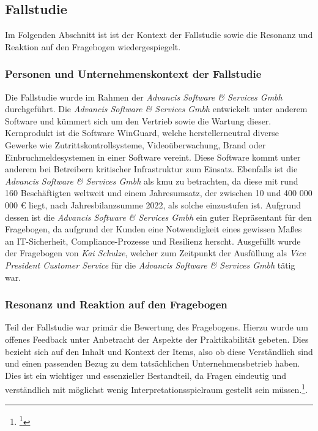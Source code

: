 \documentclass[11pt,a4paper,hidelinks]{article}   %
\begin{document}
        \subsection{Fallstudie}
        Im Folgenden Abschnitt ist ist der Kontext der Fallstudie sowie die Resonanz und Reaktion auf den Fragebogen wiedergespiegelt. 
        \subsubsection{Personen und Unternehmenskontext der Fallstudie}
        Die Fallstudie wurde im Rahmen der \emph{Advancis Software \& Services Gmbh} durchgeführt. Die \emph{Advancis Software \& Services Gmbh} entwickelt unter anderem Software und kümmert sich um den Vertrieb sowie die Wartung dieser. Kernprodukt ist die Software WinGuard, welche herstellerneutral diverse Gewerke wie Zutrittskontrollsysteme, Videoüberwachung, Brand oder Einbruchmeldesystemen in einer Software vereint. Diese Software kommt unter anderem bei Betreibern kritischer Infrastruktur zum Einsatz. Ebenfalls ist die \emph{Advancis Software \& Services Gmbh} als \gls{kmu} zu betrachten, da diese mit rund 160 Beschäftigten weltweit und einem Jahresumsatz, der zwischen 10 und 400 000 000 € liegt, nach Jahresbilanzsumme 2022, als solche einzustufen ist. Aufgrund dessen ist die \emph{Advancis Software \& Services Gmbh} ein guter Repräsentant für den Fragebogen, da aufgrund der Kunden eine Notwendigkeit eines gewissen Maßes an IT-Sicherheit, Compliance-Prozesse und Resilienz herscht. Ausgefüllt wurde der Fragebogen von \emph{Kai Schulze}, welcher zum Zeitpunkt der Ausfüllung als \emph{Vice President Customer Service} für die \emph{Advancis Software \& Services Gmbh} tätig war.
        \subsubsection{Resonanz und Reaktion auf den Fragebogen}
        Teil der Fallstudie war primär die Bewertung des Fragebogens. Hierzu wurde um offenes Feedback unter Anbetracht der Aspekte der Praktikabilität gebeten. Dies bezieht sich auf den Inhalt und Kontext der Items, also ob diese Verständlich sind und einen passenden Bezug zu dem tatsächlichen Unternehmensbetrieb haben. Dies ist ein wichtiger und essenzieller Bestandteil, da Fragen eindeutig und verständlich mit möglichst wenig Interpretationsspielraum gestellt sein müssen.\footnote{
            \footcite[Vgl. S 59 - 60, 62 - 64, 66 - 68][]{9783838544656}
        }.
\end{document}
